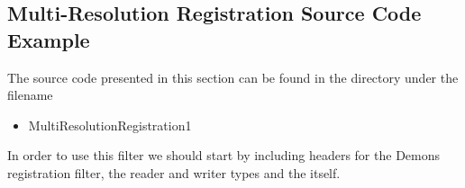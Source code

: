 \documentclass{InsightArticle}
\begin{document}
\subsection{Multi-Resolution Registration Source Code Example}

The source code presented in this section can be found in the 
directory under the filename

\begin{itemize}
\item MultiResolutionRegistration1
\end{itemize}


In order to use this filter we should start by including headers for the Demons
registration filter, the reader and writer types and the 
itself.

\begin{center}

\end{center}


\clearpage


%
%



\end{document}
